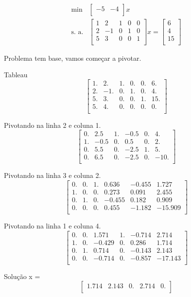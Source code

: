 \documentclass[a4paper,12pt]{article}
\begin{document}
\begin{eqnarray*} \min & \begin{bmatrix}
  -5 & -4\\
\end{bmatrix}x \\\text{s. a.} &\begin{bmatrix}
  1 & 2 & 1 & 0 & 0\\
  2 & -1 & 0 & 1 & 0\\
  5 & 3 & 0 & 0 & 1\\
\end{bmatrix}x = \begin{bmatrix}
  6\\
  4\\
  15\\
\end{bmatrix}\end{eqnarray*}
\par Problema tem base, vamos começar a pivotar.
\par Tableau
\[\begin{bmatrix}
  1. & 2. & 1. & 0. & 0. & 6.\\
  2. & -1. & 0. & 1. & 0. & 4.\\
  5. & 3. & 0. & 0. & 1. & 15.\\
  5. & 4. & 0. & 0. & 0. & 0.\\
\end{bmatrix}\]
\par Pivotando na linha 2 e coluna 1.
\[\begin{bmatrix}
  0. & 2.5 & 1. & -0.5 & 0. & 4.\\
  1. & -0.5 & 0. & 0.5 & 0. & 2.\\
  0. & 5.5 & 0. & -2.5 & 1. & 5.\\
  0. & 6.5 & 0. & -2.5 & 0. & -10.\\
\end{bmatrix}\]
\par Pivotando na linha 3 e coluna 2.
\[\begin{bmatrix}
  0. & 0. & 1. & 0.636 & -0.455 & 1.727\\
  1. & 0. & 0. & 0.273 & 0.091 & 2.455\\
  0. & 1. & 0. & -0.455 & 0.182 & 0.909\\
  0. & 0. & 0. & 0.455 & -1.182 & -15.909\\
\end{bmatrix}\]
\par Pivotando na linha 1 e coluna 4.
\[\begin{bmatrix}
  0. & 0. & 1.571 & 1. & -0.714 & 2.714\\
  1. & 0. & -0.429 & 0. & 0.286 & 1.714\\
  0. & 1. & 0.714 & 0. & -0.143 & 2.143\\
  0. & 0. & -0.714 & 0. & -0.857 & -17.143\\
\end{bmatrix}\]
\par Solução x =
\[\begin{bmatrix}
  1.714 & 2.143 & 0. & 2.714 & 0.\\
\end{bmatrix}\]
\end{document}
